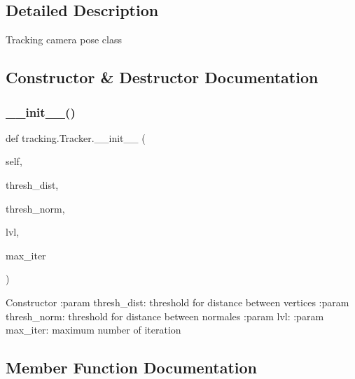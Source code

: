 \subsection{Detailed Description}
\begin{DoxyVerb}Tracking camera pose class
\end{DoxyVerb}
 

\subsection{Constructor \& Destructor Documentation}
\mbox{\label{classtracking_1_1_tracker_af4ec0591320a6a3186198e4afa34aa4a}} 
\subsubsection{\texorpdfstring{\+\_\+\+\_\+init\+\_\+\+\_\+()}{\_\_init\_\_()}}
{\footnotesize\ttfamily def tracking.\+Tracker.\+\_\+\+\_\+init\+\_\+\+\_\+ (\begin{DoxyParamCaption}\item[{}]{self,  }\item[{}]{thresh\+\_\+dist,  }\item[{}]{thresh\+\_\+norm,  }\item[{}]{lvl,  }\item[{}]{max\+\_\+iter }\end{DoxyParamCaption})}

\begin{DoxyVerb}Constructor
:param thresh_dist: threshold for distance between vertices
:param thresh_norm: threshold for distance between normales
:param lvl:
:param max_iter: maximum number of iteration
\end{DoxyVerb}
 

\subsection{Member Function Documentation}
\mbox{\label{classtracking_1_1_tracker_a74ff598370a1334ee1cf35a1d8c3c5b8}} 
